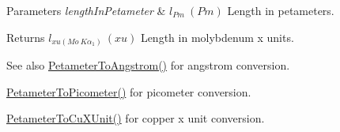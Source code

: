 \begin{DoxyParams}{Parameters}
{\em length\+In\+Petameter} & $ l_{Pm}\ (Pm)$ Length in petameters. \\
\hline
\end{DoxyParams}
\begin{DoxyReturn}{Returns}
$ l_{xu(Mo\ K\alpha_1)}\ (xu)$ Length in molybdenum x units. 
\end{DoxyReturn}
\begin{DoxySeeAlso}{See also}
\mbox{\hyperlink{group___e_g_x_math-_conversions-_length_conversions-_petameter-_non-_s_i_ga2acc301b8b78a80d23a150da8cba3814}{Petameter\+To\+Angstrom()}} for angstrom conversion. 

\mbox{\hyperlink{group___e_g_x_math-_conversions-_length_conversions-_petameter-_s_i_ga092df775702bdd1b027e20a243d0aa75}{Petameter\+To\+Picometer()}} for picometer conversion. 

\mbox{\hyperlink{group___e_g_x_math-_conversions-_length_conversions-_petameter-_non-_s_i_gad9b37964189c5963e4c634122fd763fe}{Petameter\+To\+Cu\+X\+Unit()}} for copper x unit conversion. 
\end{DoxySeeAlso}
